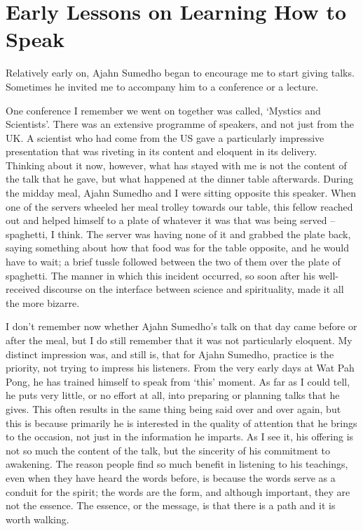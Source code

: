 \chapter{Early Lessons on Learning How to Speak}

Relatively early on, Ajahn Sumedho began to encourage me to start giving
talks. Sometimes he invited me to accompany him to a conference or a
lecture.

One conference I remember we went on together was called, `Mystics and
Scientists'. There was an extensive programme of speakers, and not just
from the UK. A scientist who had come from the US gave a particularly
impressive presentation that was riveting in its content and eloquent in
its delivery. Thinking about it now, however, what has stayed with me is
not the content of the talk that he gave, but what happened at the
dinner table afterwards. During the midday meal, Ajahn Sumedho and I
were sitting opposite this speaker. When one of the servers wheeled her
meal trolley towards our table, this fellow reached out and helped
himself to a plate of whatever it was that was being served --
spaghetti, I think. The server was having none of it and grabbed the
plate back, saying something about how that food was for the table
opposite, and he would have to wait; a brief tussle followed between the
two of them over the plate of spaghetti. The manner in which this
incident occurred, so soon after his well-received discourse on the
interface between science and spirituality, made it all the more
bizarre.

I don't remember now whether Ajahn Sumedho's talk on that day came
before or after the meal, but I do still remember that it was not
particularly eloquent. My distinct impression was, and still is, that
for Ajahn Sumedho, practice is the priority, not trying to impress his
listeners. From the very early days at Wat Pah Pong, he has trained
himself to speak from `this' moment. As far as I could tell, he puts
very little, or no effort at all, into preparing or planning talks that
he gives. This often results in the same thing being said over and over
again, but this is because primarily he is interested in the quality of
attention that he brings to the occasion, not just in the information he
imparts. As I see it, his offering is not so much the content of the
talk, but the sincerity of his commitment to awakening. The reason
people find so much benefit in listening to his teachings, even when
they have heard the words before, is because the words serve as a
conduit for the spirit; the words are the form, and although important,
they are not the essence. The essence, or the message, is that there is
a path and it is worth walking.


